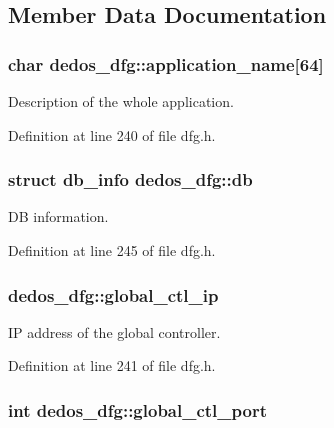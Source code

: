 \subsection{Member Data Documentation}
\hypertarget{structdedos__dfg_a0eceb9cb1a7d21b3ed8f9be508522780}{
\subsubsection[{application\-\_\-name}]{\setlength{\rightskip}{0pt plus 5cm}char dedos\-\_\-dfg\-::application\-\_\-name\mbox{[}64\mbox{]}}}\label{structdedos__dfg_a0eceb9cb1a7d21b3ed8f9be508522780}


Description of the whole application. 



Definition at line 240 of file dfg.\-h.

\hypertarget{structdedos__dfg_ad8621d636821cbbe634b07738898a17e}{
\subsubsection[{db}]{\setlength{\rightskip}{0pt plus 5cm}struct {\bf db\-\_\-info} dedos\-\_\-dfg\-::db}}\label{structdedos__dfg_ad8621d636821cbbe634b07738898a17e}


D\-B information. 



Definition at line 245 of file dfg.\-h.

\hypertarget{structdedos__dfg_acab1dc92b08936f48e02d5f1eb1a4f51}{
\subsubsection[{global\-\_\-ctl\-\_\-ip}]{ dedos\-\_\-dfg\-::global\-\_\-ctl\-\_\-ip}}\label{structdedos__dfg_acab1dc92b08936f48e02d5f1eb1a4f51}


I\-P address of the global controller. 



Definition at line 241 of file dfg.\-h.

\hypertarget{structdedos__dfg_ab0e37e7cbde75494f9f9dc509ff06faa}{
\subsubsection[{global\-\_\-ctl\-\_\-port}]{\setlength{\rightskip}{0pt plus 5cm}int dedos\-\_\-dfg\-::global\-\_\-ctl\-\_\-port}}\label{structdedos__dfg_ab0e37e7cbde75494f9f9dc509ff06faa}


